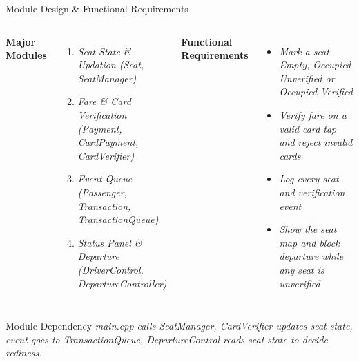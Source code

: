 \documentclass[aspectratio=169,11pt]{beamer}
\newcommand{\smallnote}[1]{%
\vspace{0.08cm}
{\scriptsize\color{GEUGrey}#1}
}
\newcommand{\placeholder}[1]{%
\textit{\color{GEUGrey}#1}
}
\begin{document}
\begin{frame}{Module Design \& Functional Requirements}

\vspace{-8mm}

\begin{columns}[T,totalwidth=\textwidth]


\textbf{\color{GEUBlue}Major Modules}

\begin{enumerate}\itemsep3pt
\item \placeholder{Seat State \& Updation (Seat, SeatManager)}
\item \placeholder{Fare \& Card Verification (Payment, CardPayment, CardVerifier)}
\item \placeholder{Event Queue (Passenger, Transaction, TransactionQueue)}
\item \placeholder{Status Panel \& Departure (DriverControl, DepartureController)}
\end{enumerate}


\textbf{\color{GEUBlue}Functional Requirements}

\begin{itemize}\itemsep3pt
\item \placeholder{Mark a seat Empty, Occupied Unverified or Occupied Verified}
\item \placeholder{Verify fare on a valid card tap and reject invalid cards}
\item \placeholder{Log every seat and verification event}
\item \placeholder{Show the seat map and block departure while any seat is unverified}
\end{itemize}

\end{columns}

\vfill

\begin{block}{Module Dependency}
\placeholder{
main.cpp calls SeatManager, CardVerifier updates seat state, event goes to TransactionQueue, DepartureControl reads seat state to decide rediness.
}
\end{block}


\end{frame}
\end{document}
